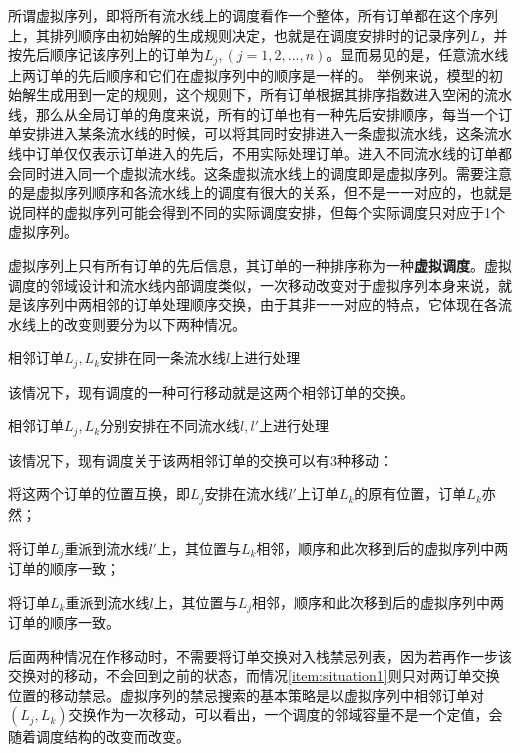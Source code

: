 所谓虚拟序列，即将所有流水线上的调度看作一个整体，所有订单都在这个序列上，其排列顺序由初始解的生成规则决定，也就是在调度安排时的记录序列$L$，并按先后顺序记该序列上的订单为$L_j, (j = 1,2,...,n)$。显而易见的是，任意流水线上两订单的先后顺序和它们在虚拟序列中的顺序是一样的。
举例来说，模型的初始解生成用到一定的规则，这个规则下，所有订单根据其排序指数进入空闲的流水线，那么从全局订单的角度来说，所有的订单也有一种先后安排顺序，每当一个订单安排进入某条流水线的时候，可以将其同时安排进入一条虚拟流水线，这条流水线中订单仅仅表示订单进入的先后，不用实际处理订单。进入不同流水线的订单都会同时进入同一个虚拟流水线。这条虚拟流水线上的调度即是虚拟序列。需要注意的是虚拟序列顺序和各流水线上的调度有很大的关系，但不是一一对应的，也就是说同样的虚拟序列可能会得到不同的实际调度安排，但每个实际调度只对应于1个虚拟序列。

虚拟序列上只有所有订单的先后信息，其订单的一种排序称为一种\textbf{虚拟调度}。虚拟调度的邻域设计和流水线内部调度类似，一次移动改变对于虚拟序列本身来说，就是该序列中两相邻的订单处理顺序交换，由于其非一一对应的特点，它体现在各流水线上的改变则要分为以下两种情况。
\begin{asparaenum}
\item 相邻订单$L_j, L_k$安排在同一条流水线$l$上进行处理

该情况下，现有调度的一种可行移动就是这两个相邻订单的交换。
\item 相邻订单$L_j, L_k$分别安排在不同流水线$l, l'$上进行处理
\end{asparaenum}

该情况下，现有调度关于该两相邻订单的交换可以有$3$种移动：
\begin{inparaenum}
\renewcommand{\theenumi}{\protect\setcounter{local}{171 + \the\value{enumi}}\protect\ding{\value{local}}}
\renewcommand{\labelenumi}{\theenumi}
\item 将这两个订单的位置互换，即$L_j$安排在流水线$l'$上订单$L_k$的原有位置，订单$L_k$亦然\label{item:situation1}；
\item 将订单$L_j$重派到流水线$l'$上，其位置与$L_k$相邻，顺序和此次移到后的虚拟序列中两订单的顺序一致；
\item 将订单$L_k$重派到流水线$l$上，其位置与$L_j$相邻，顺序和此次移到后的虚拟序列中两订单的顺序一致。
\end{inparaenum}

后面两种情况在作移动时，不需要将订单交换对入栈禁忌列表，因为若再作一步该交换对的移动，不会回到之前的状态，而情况\ref{item:situation1}则只对两订单交换位置的移动禁忌。虚拟序列的禁忌搜索的基本策略是以虚拟序列中相邻订单对$(L_j, L_k)$交换作为一次移动，可以看出，一个调度的邻域容量不是一个定值，会随着调度结构的改变而改变。

